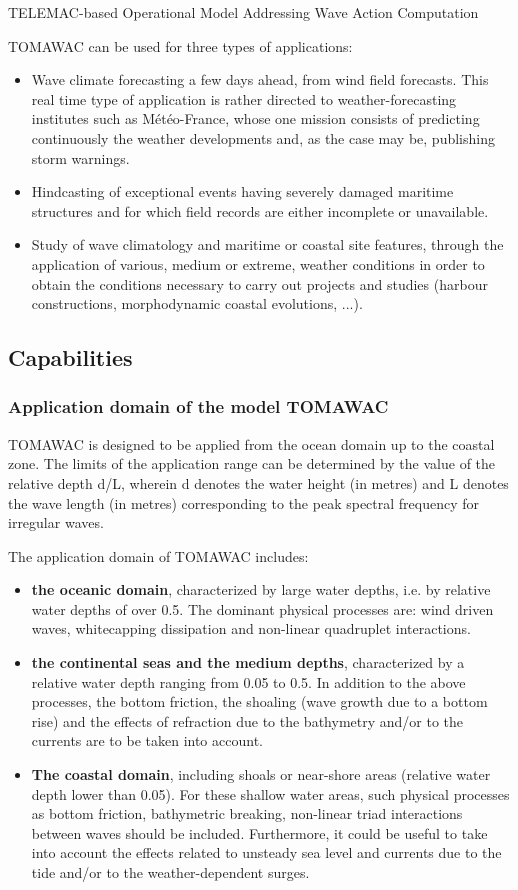 TELEMAC-based Operational Model Addressing Wave Action Computation

TOMAWAC can be used for three types of applications:
\begin{itemize}
\item	Wave climate forecasting a few days ahead, from wind field forecasts. This real time type of application is rather directed to weather-forecasting institutes such as Météo-France, whose one mission consists of predicting continuously the weather developments and, as the case may be, publishing storm warnings.
\item	Hindcasting of exceptional events having severely damaged maritime structures and for which field records are either incomplete or unavailable.
\item	Study of wave climatology and maritime or coastal site features, through the application of various, medium or extreme, weather conditions in order to obtain the conditions necessary to carry out projects and studies (harbour constructions, morphodynamic coastal evolutions, ...).
\end{itemize}

\subsection{Capabilities}
 \subsubsection{Application domain of the model TOMAWAC}
\label{par31}
TOMAWAC is designed to be applied from the ocean domain up to the coastal zone. The limits of the application range can be determined by the value of the relative depth d/L, wherein d denotes the water height (in metres) and L denotes the wave length (in metres) corresponding to the peak spectral frequency for irregular waves.

The application domain of TOMAWAC includes:
\begin{itemize}
\item {\bf the oceanic domain}, characterized by large water depths, i.e. by relative water depths of over 0.5. The dominant physical processes are: wind driven waves, whitecapping dissipation and non-linear quadruplet interactions.
\item {\bf the continental seas and the medium depths}, characterized by a relative water depth ranging from 0.05 to 0.5. In addition to the above processes, the bottom friction, the shoaling (wave growth due to a bottom rise) and the effects of refraction due to the bathymetry and/or to the currents are to be taken into account.
\item {\bf The coastal domain}, including shoals or near-shore areas (relative water depth lower than 0.05). For these shallow water areas, such physical processes as bottom friction, bathymetric breaking, non-linear triad interactions between waves should be included. Furthermore, it could be useful to take into account the effects related to unsteady sea level and currents due to the tide and/or to the weather-dependent surges.
\end{itemize}

